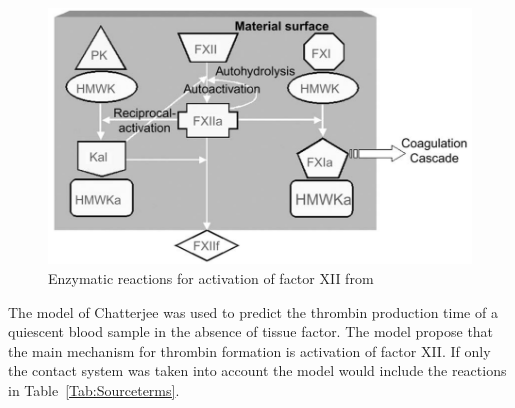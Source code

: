 \documentclass[%
 nofootinbib,
 amsmath,amssymb,
 aps,
 pra,
]{revtex4-1}
\begin{document}
\begin{figure}[h]
\includegraphics[scale=0.4]{Figures/ActivationFXIIa.png}
\caption{\label{fig:activationFXIIa} Enzymatic reactions for activation of  factor XII from \citet{Chatterjee:2009a}}
\end{figure}
The model of Chatterjee was used to predict the thrombin production time of a quiescent blood sample in the absence of tissue factor. The model propose that the main mechanism for thrombin formation is activation of factor XII. If only the contact system was taken into account the model would include the reactions in Table~\ref{Tab:Sourceterms}.\\
\end{document}
